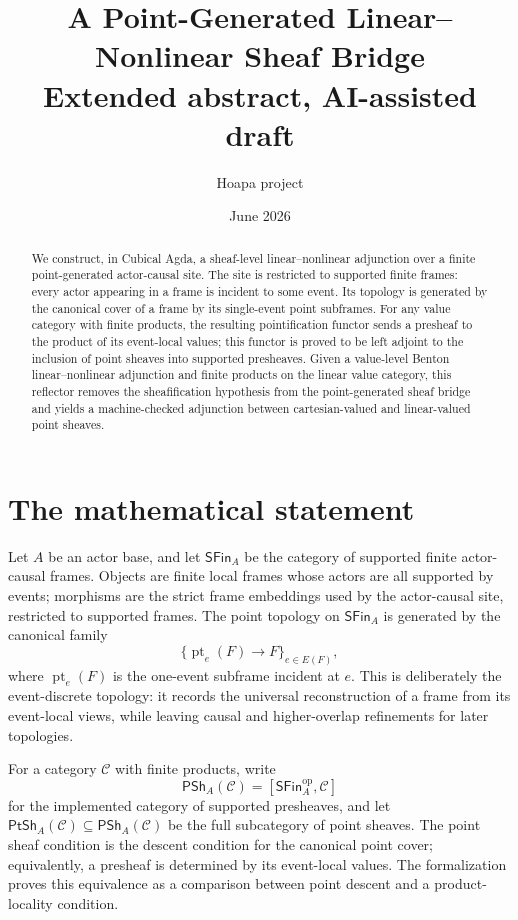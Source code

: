 \documentclass[10pt]{article}
\title{A Point-Generated Linear--Nonlinear Sheaf Bridge\\
\large Extended abstract, AI-assisted draft}
\author{Hoapa project}
\date{June 2026}
\newcommand{\PSh}{\mathsf{PSh}}
\newcommand{\PtSh}{\mathsf{PtSh}}
\newcommand{\SFin}{\mathsf{SFin}}
\begin{document}
\maketitle

\begin{abstract}
We construct, in Cubical Agda, a sheaf-level linear--nonlinear adjunction over a finite point-generated actor-causal site.  The site is restricted to supported finite frames: every actor appearing in a frame is incident to some event.  Its topology is generated by the canonical cover of a frame by its single-event point subframes.  For any value category with finite products, the resulting pointification functor sends a presheaf to the product of its event-local values; this functor is proved to be left adjoint to the inclusion of point sheaves into supported presheaves.  Given a value-level Benton linear--nonlinear adjunction and finite products on the linear value category, this reflector removes the sheafification hypothesis from the point-generated sheaf bridge and yields a machine-checked adjunction between cartesian-valued and linear-valued point sheaves.
\end{abstract}

\section*{The mathematical statement}

Let $A$ be an actor base, and let $\SFin_A$ be the category of supported finite actor-causal frames.  Objects are finite local frames whose actors are all supported by events; morphisms are the strict frame embeddings used by the actor-causal site, restricted to supported frames.  The point topology on $\SFin_A$ is generated by the canonical family
\[
  \{\operatorname{pt}_e(F) \longrightarrow F\}_{e \in E(F)},
\]
where $\operatorname{pt}_e(F)$ is the one-event subframe incident at $e$.  This is deliberately the event-discrete topology: it records the universal reconstruction of a frame from its event-local views, while leaving causal and higher-overlap refinements for later topologies.

For a category $\mathcal C$ with finite products, write
\[
  \PSh_A(\mathcal C) = [\SFin_A^{\mathrm{op}},\mathcal C]
\]
for the implemented category of supported presheaves, and let $\PtSh_A(\mathcal C) \subseteq \PSh_A(\mathcal C)$ be the full subcategory of point sheaves.  The point sheaf condition is the descent condition for the canonical point cover; equivalently, a presheaf is determined by its event-local values.  The formalization proves this equivalence as a comparison between point descent and a product-locality condition.
\end{document}
